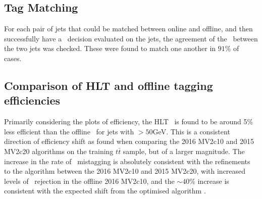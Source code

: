 	\subsection{Tag Matching}

	For each pair of jets that could be matched between online and offline, and then successfully have a \btag\, decision evaluated on the jets, the agreement of the \btag\, between the two jets was checked. These were found to match one another in $91\%$ of cases.

	\subsection{Comparison of HLT and offline tagging efficiencies}

		Primarily considering the \pt plots of efficiency, the HLT \btag\, is found to be around 5\% less efficient than the offline \btag\, for jets with \pt$>50$GeV. This is a consistent direction of efficiency shift as found when comparing the 2016 MV2c10 and 2015 MV2c20 algorithms on the training $t\bar{t}$ sample, but of a larger magnitude. The increase in the rate of \cjet\, mistagging is absolutely consistent with the refinements to the algorithm between the 2016 MV2c10 and 2015 MV2c20, with increased levels of \cjet\, rejection in the offline 2016 MV2c10, and the $\sim40$\% increase is consistent with the expected shift from the optimised algorithm \cite{btagOptimisation}.


\endinput
